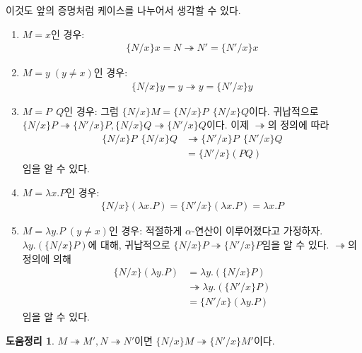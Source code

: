 \documentclass[b5paper, 11pt]{book}
\theoremstyle{definition}
\newtheorem{lem}[defn]{도움정리}
\newenvironment{pf*}{\pushQED{\qed}\pf}
{\popQED\endpf}
\begin{document}
\begin{pf*} 
    이것도 앞의 증명처럼 케이스를 나누어서 생각할 수 있다.
    \begin{enumerate}
        \item $M = x$인 경우: 
        \begin{align*}
            \{N / x\} x = N \twoheadrightarrow N' = \{N' / x\} x
        \end{align*}
        \item $M = y\; (y \neq x)$인 경우:
        \begin{align*}
            \{N / x\} y = y \twoheadrightarrow y = \{N' / x\} y
        \end{align*}
        \item $M = P \;\, Q$인 경우:
        그럼 $\{N /x \} M = \{N /x \} P \;\, \{N /x \} Q $이다. 귀납적으로 $\{N /x \} P \twoheadrightarrow \{N' /x\} P,\{N /x \} Q \twoheadrightarrow \{N' /x \} Q $이다.
        이제 $\twoheadrightarrow$의 정의에 따라 
        \begin{align*}
            \{N /x \} P \;\, \{N /x \} Q &\twoheadrightarrow \{N' / x \} P \;\, \{N' /x \} Q \\
            &= \{N' / x\} (PQ)    
        \end{align*}
        임을 알 수 있다.
        \item $M = \lambda x. P$인 경우: 
        \begin{align*}
            \{N / x\} (\lambda x. P) = \{N' / x \} (\lambda x.P) = \lambda x. P
        \end{align*}
        \item $M = \lambda y. P \; (y \neq x)$인 경우: 적절하게 $\alpha$-연산이 이루어졌다고 가정하자. $\lambda y. (\{N / x\} P)$에 대해, 귀납적으로 $\{N / x\} P \twoheadrightarrow \{N' / x \} P$임을 알 수 있다. $\twoheadrightarrow$의 정의에 의해
        \begin{align*}
            \{N / x\} (\lambda y. P)& = \lambda y. (\{N /x\} P) \\ 
            &\twoheadrightarrow \lambda y. (\{ N' / x \} P) \\
            &= \{N' / x\} (\lambda y. P)
        \end{align*}
        임을 알 수 있다.
    \end{enumerate}
\end{pf*}
\begin{lem}
    $M \twoheadrightarrow M', N \twoheadrightarrow N'$이면 $\{N / x \} M \twoheadrightarrow \{ N' / x \} M'$이다.
\end{lem}
\end{document}
